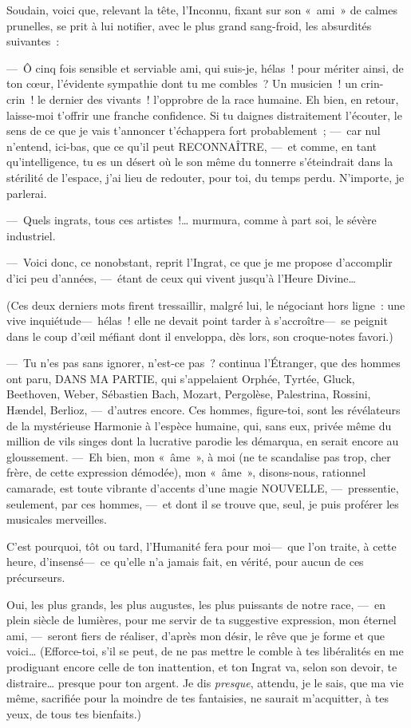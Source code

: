 \documentclass[french,twoside]{book} %
\begin{document}
Soudain, voici que, relevant la tête, l’Inconnu, fixant sur son « ami » de calmes prunelles, se prit à lui notifier, avec le plus grand sang-froid, les absurdités suivantes :\par
— Ô cinq fois sensible et serviable ami, qui   suis-je, hélas ! pour mériter ainsi, de ton cœur, l’évidente sympathie dont tu me combles ? Un musicien ! un crin-crin ! le dernier des vivants ! l’opprobre de la race humaine. Eh bien, en retour, laisse-moi t’offrir une franche confidence. Si tu daignes distraitement l’écouter, le sens de ce que je vais t’annoncer t’échappera fort probablement ; — car nul n’entend, ici-bas, que ce qu’il peut RECONNAÎTRE, — et comme, en tant qu’intelligence, tu es un désert où le son même du tonnerre s’éteindrait dans la stérilité de l’espace, j’ai lieu de redouter, pour toi, du temps perdu. N’importe, je parlerai.\par
— Quels ingrats, tous ces artistes !… murmura, comme à part soi, le sévère industriel.\par
— Voici donc, ce nonobstant, reprit l’Ingrat, ce que je me propose d’accomplir d’ici peu d’années, — étant de ceux qui vivent jusqu’à l’Heure Divine…\par
(Ces deux derniers mots firent tressaillir, malgré lui, le négociant hors ligne : une vive inquiétude— hélas ! elle ne devait point tarder à s’accroître— se peignit dans le coup d’œil   méfiant dont il enveloppa, dès lors, son croque-notes favori.)\par
— Tu n’es pas sans ignorer, n’est-ce pas ? continua l’Étranger, que des hommes ont paru, DANS MA PARTIE, qui s’appelaient Orphée, Tyrtée, Gluck, Beethoven, Weber, Sébastien Bach, Mozart, Pergolèse, Palestrina, Rossini, Hændel, Berlioz, — d’autres encore. Ces hommes, figure-toi, sont les révélateurs de la mystérieuse Harmonie à l’espèce humaine, qui, sans eux, privée même du million de vils singes dont la lucrative parodie les démarqua, en serait encore au gloussement. — Eh bien, mon « âme », à moi (ne te scandalise pas trop, cher frère, de cette expression démodée), mon « âme », disons-nous, rationnel camarade, est toute vibrante d’accents d’une magie NOUVELLE, — pressentie, seulement, par ces hommes, — et dont il se trouve que, seul, je puis proférer les musicales merveilles.\par
C’est pourquoi, tôt ou tard, l’Humanité fera pour moi— que l’on traite, à cette heure, d’insensé— ce qu’elle n’a jamais fait, en vérité, pour aucun de ces précurseurs.\par
   Oui, les plus grands, les plus augustes, les plus puissants de notre race, — en plein siècle de lumières, pour me servir de ta suggestive expression, mon éternel ami, — seront fiers de réaliser, d’après mon désir, le rêve que je forme et que voici… (Efforce-toi, s’il se peut, de ne pas mettre le comble à tes libéralités en me prodiguant encore celle de ton inattention, et ton Ingrat va, selon son devoir, te distraire… presque pour ton argent. Je dis \emph{presque}, attendu, je le sais, que ma vie même, sacrifiée pour la moindre de tes fantaisies, ne saurait m’acquitter, à tes yeux, de tous tes bienfaits.)\par
\end{document}
